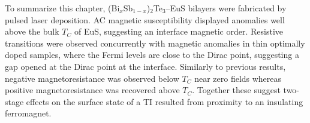 To summarize this chapter, (Bi$_x$Sb$_{1-x}$)$_2$Te$_3$--EuS bilayers were fabricated by pulsed laser deposition. AC magnetic susceptibility displayed anomalies well above the bulk $T_C$ of EuS, suggesting an interface magnetic order. Resistive transitions were observed concurrently with magnetic anomalies in thin optimally doped samples, where the Fermi levels are close to the Dirac point, suggesting a gap opened at the Dirac point at the interface. Similarly to previous results, negative magnetoresistance was observed below $T_C$ near zero fields whereas positive magnetoresistance was recovered above $T_C$. Together these suggest two-stage effects on the surface state of a TI resulted from proximity to an insulating ferromagnet.